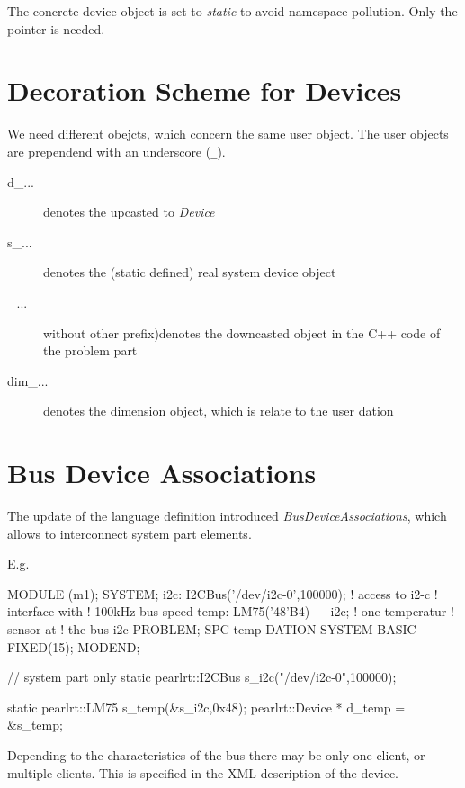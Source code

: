The concrete device object is set to {\em static} to avoid namespace pollution.
Only the pointer is needed.

\section{Decoration Scheme for Devices}
We need different obejcts, which concern the same user object.
The user objects are prependend with an underscore (\verb|_|).

\begin{description}
\item[d\_...] denotes the upcasted to {\em Device} 
\item[s\_...] denotes the (static defined) real system device object
\item[\_...] without other prefix)denotes the downcasted object in 
     the C++ code of the problem part
\item[dim\_...] denotes the dimension object, which is relate to the 
   user dation
\end{description}

\section{Bus Device Associations}
The update of the language definition introduced {\em BusDeviceAssociations},
which allows to interconnect system part elements.

E.g.
\begin{PEARLCode}
MODULE (m1);
SYSTEM;
   i2c: I2CBus('/dev/i2c-0',100000);  ! access to i2-c
                                      ! interface with 
                                      ! 100kHz bus speed
   temp: LM75('48'B4) --- i2c;        ! one temperatur
                                      ! sensor at
                                      ! the bus i2c
PROBLEM;
   SPC temp DATION SYSTEM BASIC FIXED(15);
MODEND;
\end{PEARLCode}

\begin{CppCode}
// system part only
static pearlrt::I2CBus s_i2c("/dev/i2c-0",100000);

static pearlrt::LM75 s_temp(&s_i2c,0x48);
       pearlrt::Device * d_temp = &s_temp;
\end{CppCode}

Depending to the characteristics of the bus there may be only one client,
or multiple clients. This is specified in the XML-description of the 
device.

